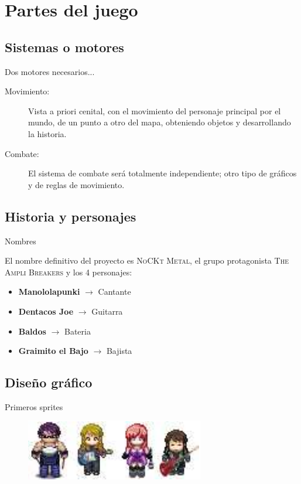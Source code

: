 \documentclass[9pt,xcolor=svgnames]{beamer}
\begin{document}
 \section{Partes del juego}
 
  \subsection{Sistemas o motores}
  
  \begin{frame}{Dos motores necesarios...}
   \transdissolve
   
   \begin{description}
    \item[Movimiento: ] Vista a priori cenital, con el movimiento del
	       personaje principal por el mundo, de un punto a otro del
	       mapa, obteniendo objetos y desarrollando la historia.
    \item[Combate: ] El sistema de combate será totalmente
	       independiente; otro tipo de gráficos y de reglas de
	       movimiento.
   \end{description}
   
  \end{frame}
  
  \subsection{Historia y personajes}
  
  \begin{frame}{Nombres}
   \transdissolve
   
   El nombre definitivo del proyecto es \textsc{NoCKt
   Metal}, el grupo protagonista \textsc{The Ampli Breakers} y los
   4 personajes:
   \begin{itemize}
    \item \textbf{Manololapunki} $\longrightarrow$ Cantante
    \item \textbf{Dentacos Joe} $\longrightarrow$ Guitarra
    \item \textbf{Baldos} $\longrightarrow$ Bateria
    \item \textbf{Graimito el Bajo} $\longrightarrow$ Bajista
   \end{itemize}
   
  \end{frame}
  
  \subsection{Diseño gráfico}
  
  \begin{frame}{Primeros sprites}
   \transdissolve
   
   \begin{figure}[t]
    \centering
    \includegraphics[scale=1]{./Imagenes/grupo.pdf}    
   \end{figure}
  \end{frame}
  
  
  
\end{document}
